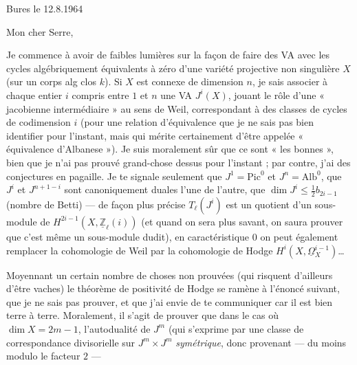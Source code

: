 \documentclass[11pt,a4paper]{article}
\begin{document}

Bures le 12.8.1964

Mon cher Serre,

Je commence à avoir de faibles lumières sur la façon de faire des VA avec les
cycles algébriquement équivalents à zéro d'une variété projective non
singulière $X$ (sur un corps alg clos $k$). Si $X$ est connexe de dimension $n$,
je sais associer à chaque entier $i$ compris entre $1$ et $n$ une VA $J^{i}(X)$,
jouant le rôle d'une « jacobienne intermédiaire » au sens de Weil, correspondant
à des classes de cycles de codimension $i$ (pour une relation d'équivalence que
je ne sais pas bien identifier pour l'instant, mais qui mérite certainement
d'être appelée « équivalence d'Albanese »). Je suis moralement sûr que ce sont
« les bonnes », bien que je n'ai pas prouvé grand-chose dessus pour l'instant ;
par contre, j'ai des conjectures en pagaille. Je te signale
seulement que $J^{1} = \mathrm{Pic}^{0}$ et $J^{n} = \mathrm{Alb}^{0}$, que
$J^{i}$ et $J^{n+1-i}$ sont canoniquement duales l'une de l'autre, que $\dim
J^{i} \leq \tfrac{1}{2} b_{2i-1}$ (nombre de Betti) --- de façon plus précise
$T_{\ell}(J^{i})$ est un quotient d'un sous-module de $H^{2i-1}(X,
\underline{\mathbb{Z}}_{\ell}(i))$ (et quand on sera plus savant, on saura
prouver que c'est même un sous-module dudit), en caractéristique $0$ on peut
également remplacer la cohomologie de Weil par la cohomologie de Hodge $H^{i}(X,
\underline{\Omega}{}^{i-1}_{X})$\ldots


\marginal{\struck{\ill{}}}


Moyennant un certain nombre de choses non prouvées (qui risquent d'ailleurs
d'être vaches) le théorème de positivité de Hodge se ramène à l'énoncé suivant,
que je ne sais pas prouver, et que j'ai envie de te communiquer car il est bien
terre à terre. Moralement, il s'agit de prouver que dans le cas où $\dim X =
2m-1$, l'autodualité de $J^{m}$ (qui s'exprime par une classe de correspondance
divisorielle sur $J^{m}\times J^{m}$ \struck{\ill{}} \emph{symétrique}, donc
provenant --- du moins modulo le facteur $2$ ---


\end{document}

